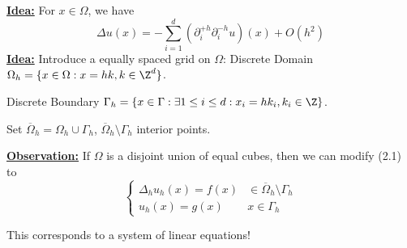 

\underline{\textbf{Idea:}} For $x\in\Omega$, we have 
\[\Delta u(x)=-\sum_{i=1}^d (\partial_i^{+h}\partial_i^{-h}u)(x)+O(h^2)\]
\underline{\textbf{Idea:}} Introduce a equally spaced grid on $\Omega$:
Discrete Domain $\Omega_h=\{x\in \Omega: x=hk,k\in\Z^d\}$.

Discrete Boundary $\Gamma_h=\{x\in\Gamma:\exists 1 \leq i \leq d: x_i=hk_i,k_i\in \Z\}$.

Set $\overline{\Omega}_h=\Omega_h\cup\Gamma_h$, $\overline{\Omega}_h\setminus \Gamma_h$ interior points.

\underline{\textbf{Observation:}} If $\Omega$ is a disjoint union of equal cubes, then
we can modify (2.1) to \[\begin{cases}
    \Delta_h u_h(x)=f(x) & \in\overline{\Omega}_h\setminus \Gamma_h\\
    u_h(x)=g(x) & x\in \Gamma_h
\end{cases}\]

This corresponds to a system of linear equations!

